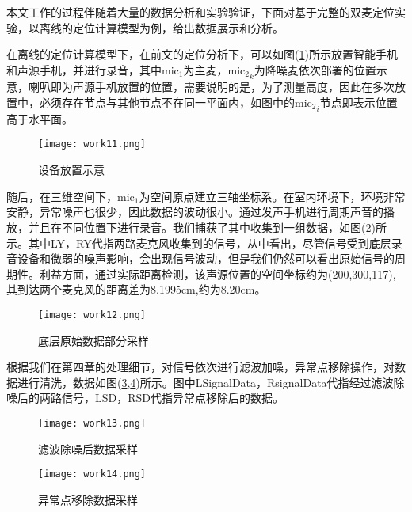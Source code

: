 \documentclass[winfonts,oneside]{njuthesis}
\begin{document}
		本文工作的过程伴随着大量的数据分析和实验验证，下面对基于完整的双麦定位实验，以离线的定位计算模型为例，给出数据展示和分析。
		
		在离线的定位计算模型下，在前文的定位分析下，可以如图(\ref{fig: work11})所示放置智能手机和声源手机，并进行录音，其中$\text{mic}_1$为主麦，${\text{mic}_2}_k$为降噪麦依次部署的位置示意，喇叭即为声源手机放置的位置，需要说明的是，为了测量高度，因此在多次放置中，必须存在节点与其他节点不在同一平面内，如图中的${\text{mic}_2}_i$节点即表示位置高于水平面。
			
		\begin{figure}[H]
			\centering
			\texttt{[image: work11.png]}
			\caption{设备放置示意}
			\label{fig: work11}
		\end{figure}
			
		随后，在三维空间下，$\text{mic}_1$为空间原点建立三轴坐标系。在室内环境下，环境非常安静，异常噪声也很少，因此数据的波动很小。通过发声手机进行周期声音的播放，并且在不同位置下进行录音。我们捕获了其中收集到一组数据，如图(\ref{fig: work12})所示。其中LY，RY代指两路麦克风收集到的信号，从中看出，尽管信号受到底层录音设备和微弱的噪声影响，会出现信号波动，但是我们仍然可以看出原始信号的周期性。利益方面，通过实际距离检测，该声源位置的空间坐标约为(200,300,117),其到达两个麦克风的距离差为8.1995cm,约为8.20cm。
			
		\begin{figure}[H]
			\centering
			\texttt{[image: work12.png]}
			\caption{底层原始数据部分采样}
			\label{fig: work12}
		\end{figure}
	
		根据我们在第四章的处理细节，对信号依次进行滤波加噪，异常点移除操作，对数据进行清洗，数据如图(\ref{fig: work13},\ref{fig: work14})所示。图中LSignalData，RsignalData代指经过滤波除噪后的两路信号，LSD，RSD代指异常点移除后的数据。
		
		\begin{figure}[H]
			\centering
			\texttt{[image: work13.png]}
			\caption{滤波除噪后数据采样}
			\label{fig: work13}
		\end{figure}
	
	
		\begin{figure}[H]
			\centering
			\texttt{[image: work14.png]}
			\caption{异常点移除数据采样}
			\label{fig: work14}
		\end{figure}
\end{document}
